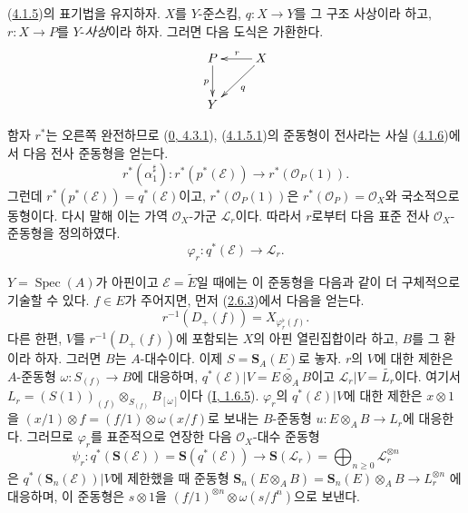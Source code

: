 \begin{env}[4.2.1]
\label{II.4.2.1-ko}
(\hyperref[II.4.1.5-ko]{4.1.5})의 표기법을 유지하자. $X$를
$Y$-준스킴, $q:X\to Y$를 그 구조 사상이라 하고, $r:X\to P$를
$Y$-\emph{사상}이라 하자. 그러면 다음 도식은 가환한다.
\[
  \xymatrix{
    P \ar[d]_p & X \ar[l]_r \ar[dl]^q
    \\Y
  }
\]


함자 $r^*$는 오른쪽 완전하므로
(\hyperref[0.4.3.1-ko]{0, 4.3.1}),
(\hyperref[II.4.1.5.1-ko]{4.1.5.1})의 준동형이 전사라는 사실
(\hyperref[II.4.1.6-ko]{4.1.6})에서 다음 전사 준동형을 얻는다.
\[
  r^*(\alpha_1^\sharp):r^*(p^*(\mathcal{E}))\longrightarrow
  r^*(\mathcal{O}_P(1)).
\]
그런데 $r^*(p^*(\mathcal{E}))=q^*(\mathcal{E})$이고,
$r^*(\mathcal{O}_P(1))$은
$r^*(\mathcal{O}_P)=\mathcal{O}_X$와 국소적으로 동형이다. 다시 말해 이는
가역 $\mathcal{O}_X$-가군 $\mathcal{L}_r$이다. 따라서 $r$로부터 다음
표준 전사 $\mathcal{O}_X$-준동형을 정의하였다.
\[
\label{II.4.2.1.1-ko}
  \varphi_r:q^*(\mathcal{E})\longrightarrow\mathcal{L}_r.
\tag{4.2.1.1}
\]

$Y=\operatorname{Spec}(A)$가 아핀이고
$\mathcal{E}=\widetilde{E}$일 때에는 이 준동형을 다음과 같이 더
구체적으로 기술할 수 있다. $f\in E$가 주어지면, 먼저
(\hyperref[II.2.6.3-ko]{2.6.3})에서 다음을 얻는다.
\[
\label{II.4.2.1.2-ko}
  r^{-1}(D_+(f))=X_{\varphi_r^\flat(f)}.
\tag{4.2.1.2}
\]
다른 한편, $V$를 $r^{-1}(D_+(f))$에 포함되는 $X$의 아핀 열린집합이라
하고, $B$를 그 환이라 하자. 그러면 $B$는 $A$-대수이다. 이제
$S=\mathbf{S}_A(E)$로 놓자. $r$의 $V$에 대한 제한은
$A$-준동형 $\omega:S_{(f)}\to B$에 대응하며,
$q^*(\mathcal{E})|V=\widetilde{E\otimes_A B}$이고
$\mathcal{L}_r|V=\widetilde{L_r}$이다. 여기서
$L_r=(S(1))_{(f)}\otimes_{S_{(f)}}B_{[\omega]}$이다
(\hyperref[I.1.6.5-ko]{I, 1.6.5}). $\varphi_r$의
$q^*(\mathcal{E})|V$에 대한 제한은 $x\otimes1$을
$(x/1)\otimes f=(f/1)\otimes\omega(x/f)$로 보내는 $B$-준동형
$u:E\otimes_A B\to L_r$에 대응한다. 그러므로 $\varphi_r$를
표준적으로 연장한 다음 $\mathcal{O}_X$-대수 준동형
\[
  \psi_r:q^*(\mathbf{S}(\mathcal{E}))=
  \mathbf{S}(q^*(\mathcal{E}))\longrightarrow
  \mathbf{S}(\mathcal{L}_r)=\bigoplus_{n\geq0}\mathcal{L}_r^{\otimes n}
\]
은 $q^*(\mathbf{S}_n(\mathcal{E}))|V$에 제한했을 때 준동형
$\mathbf{S}_n(E\otimes_A B)=\mathbf{S}_n(E)\otimes_A B\to L_r^{\otimes n}$
에 대응하며, 이 준동형은 $s\otimes1$을
$(f/1)^{\otimes n}\otimes\omega(s/f^n)$으로 보낸다.
\end{env}

